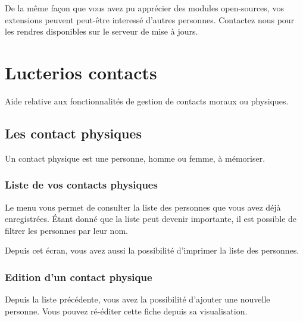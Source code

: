 \documentclass[letterpaper,10pt,french]{sphinxmanual}
\begin{document}
De la même façon que vous avez pu apprécier des modules open-sources, vos extensions peuvent peut-être interessé d’autres personnes.
Contactez nous pour les rendres disponibles sur le serveur de mise à jours.
\begin{quote}


\end{quote}


\chapter{Lucterios contacts}
\label{\detokenize{contacts/index:lucterios-contacts}}\label{\detokenize{contacts/index::doc}}
Aide relative aux fonctionnalités de gestion de contacts moraux ou physiques.


\section{Les contact physiques}
\label{\detokenize{contacts/individual:les-contact-physiques}}\label{\detokenize{contacts/individual::doc}}
Un contact physique est une personne, homme ou femme, à mémoriser.


\subsection{Liste de vos contacts physiques}
\label{\detokenize{contacts/individual:liste-de-vos-contacts-physiques}}
Le menu  vous permet de consulter la liste des personnes que vous avez déjà enregistrées. Étant donné que la liste peut devenir importante, il est possible de filtrer les personnes par leur nom.

Depuis cet écran, vous avez aussi la possibilité d’imprimer la liste des personnes.

\noindent{}


\subsection{Edition d’un contact physique}
\label{\detokenize{contacts/individual:edition-d-un-contact-physique}}
Depuis la liste précédente, vous avez la possibilité d’ajouter une nouvelle personne. Vous pouvez ré-éditer cette fiche depuis sa visualisation.
\end{document}
